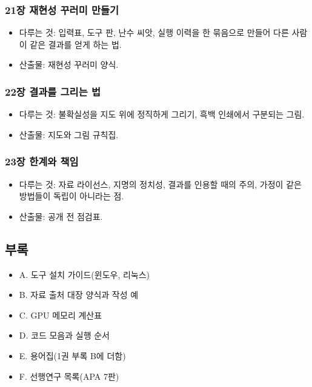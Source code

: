 \documentclass[10pt,a4paper]{article}
\providecommand{\tightlist}{\setlength{\itemsep}{0pt}\setlength{\parskip}{0pt}}
\begin{document}
\hypertarget{uxc7a5-uxc7acuxd604uxc131-uxafb8uxb7ecuxbbf8-uxb9ccuxb4e4uxae30}{%
\subsubsection{21장 재현성 꾸러미 만들기}\label{uxc7a5-uxc7acuxd604uxc131-uxafb8uxb7ecuxbbf8-uxb9ccuxb4e4uxae30}}

\begin{itemize}
\tightlist
\item
  다루는 것: 입력표, 도구 판, 난수 씨앗, 실행 이력을 한 묶음으로 만들어 다른 사람이 같은 결과를 얻게 하는 법.
\item
  산출물: 재현성 꾸러미 양식.
\end{itemize}

\hypertarget{uxc7a5-uxacb0uxacfcuxb97c-uxadf8uxb9acuxb294-uxbc95}{%
\subsubsection{22장 결과를 그리는 법}\label{uxc7a5-uxacb0uxacfcuxb97c-uxadf8uxb9acuxb294-uxbc95}}

\begin{itemize}
\tightlist
\item
  다루는 것: 불확실성을 지도 위에 정직하게 그리기, 흑백 인쇄에서 구분되는 그림.
\item
  산출물: 지도와 그림 규칙집.
\end{itemize}

\hypertarget{uxc7a5-uxd55cuxacc4uxc640-uxcc45uxc784}{%
\subsubsection{23장 한계와 책임}\label{uxc7a5-uxd55cuxacc4uxc640-uxcc45uxc784}}

\begin{itemize}
\tightlist
\item
  다루는 것: 자료 라이선스, 지명의 정치성, 결과를 인용할 때의 주의, 가정이 같은 방법들이 독립이 아니라는 점.
\item
  산출물: 공개 전 점검표.
\end{itemize}

\hypertarget{uxbd80uxb85d}{%
\subsection{부록}\label{uxbd80uxb85d}}

\begin{itemize}
\tightlist
\item
  A. 도구 설치 가이드(윈도우, 리눅스)
\item
  B. 자료 출처 대장 양식과 작성 예
\item
  C. GPU 메모리 계산표
\item
  D. 코드 모음과 실행 순서
\item
  E. 용어집(1권 부록 B에 더함)
\item
  F. 선행연구 목록(APA 7판)
\end{itemize}
\end{document}
